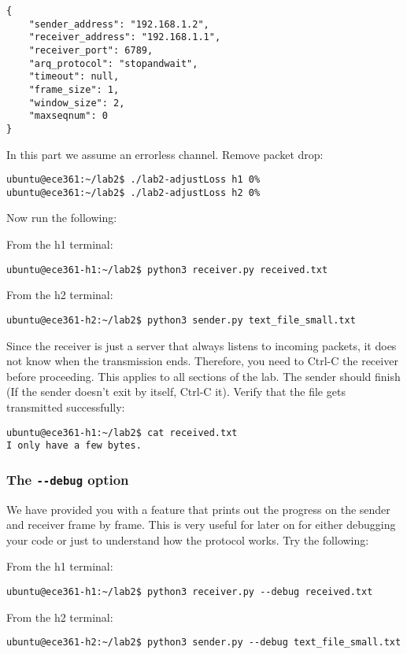 \documentclass[11pt]{article}
\begin{document}
\begin{lstlisting}[style=ece361-shell-base, caption={Configuration For Small File}]
{
    "sender_address": "192.168.1.2",
    "receiver_address": "192.168.1.1",
    "receiver_port": 6789,
    "arq_protocol": "stopandwait",
    "timeout": null,
    "frame_size": 1,
    "window_size": 2,
    "maxseqnum": 0
}
\end{lstlisting}

In this part we assume an errorless channel. Remove packet drop:
\begin{lstlisting}[style=ece361shell, caption={Setting packet loss to 0\% in both directions.}]
ubuntu@ece361:~/lab2$ ./lab2-adjustLoss h1 0%
ubuntu@ece361:~/lab2$ ./lab2-adjustLoss h2 0%
\end{lstlisting}
Now run the following:

From the h1 terminal:
\begin{lstlisting}[style=ece361-shell-base]
ubuntu@ece361-h1:~/lab2$ python3 receiver.py received.txt
\end{lstlisting}
From the h2 terminal:
\begin{lstlisting}[style=ece361-shell-base]
ubuntu@ece361-h2:~/lab2$ python3 sender.py text_file_small.txt
\end{lstlisting}
Since the receiver is just a server that always listens to incoming packets, it does not know when the transmission ends. Therefore, you need to Ctrl-C the receiver before proceeding. This applies to all sections of the lab.
The sender should finish (If the sender doesn't exit by itself, Ctrl-C it). Verify that the file gets transmitted successfully:
\begin{lstlisting}[style=ece361-shell-base]
ubuntu@ece361-h1:~/lab2$ cat received.txt
I only have a few bytes.
\end{lstlisting}

\subsubsection {The \texttt{-{}-debug} option}
We have provided you with a feature that prints out the progress on the sender and receiver frame by frame. This is very useful for later on for either debugging your code or just to understand how the protocol works. Try the following:

From the h1 terminal:
\begin{lstlisting}[style=ece361-shell-base]
ubuntu@ece361-h1:~/lab2$ python3 receiver.py --debug received.txt
\end{lstlisting}
From the h2 terminal:
\begin{lstlisting}[style=ece361-shell-base]
ubuntu@ece361-h2:~/lab2$ python3 sender.py --debug text_file_small.txt
\end{lstlisting}
\end{document}

